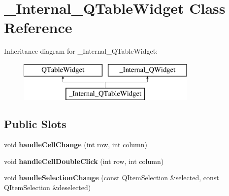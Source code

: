 \hypertarget{class__Internal__QTableWidget}{}\section{\+\_\+\+Internal\+\_\+\+Q\+Table\+Widget Class Reference}
\label{class__Internal__QTableWidget}
Inheritance diagram for \+\_\+\+Internal\+\_\+\+Q\+Table\+Widget\+:\begin{figure}[H]
\begin{center}
\leavevmode
\includegraphics[height=2.000000cm]{class__Internal__QTableWidget}
\end{center}
\end{figure}
\subsection*{Public Slots}
\begin{DoxyCompactItemize}
\item 
\mbox{\label{class__Internal__QTableWidget_abd618b9e0ee9c3408df87b5706f5738e}} 
void {\bfseries handle\+Cell\+Change} (int row, int column)
\item 
\mbox{\label{class__Internal__QTableWidget_aa8fcf8d74c47866a498232967d671ef7}} 
void {\bfseries handle\+Cell\+Double\+Click} (int row, int column)
\item 
\mbox{\label{class__Internal__QTableWidget_aa960d616823843c1916707453fab557e}} 
void {\bfseries handle\+Selection\+Change} (const Q\+Item\+Selection \&selected, const Q\+Item\+Selection \&deselected)
\end{DoxyCompactItemize}
